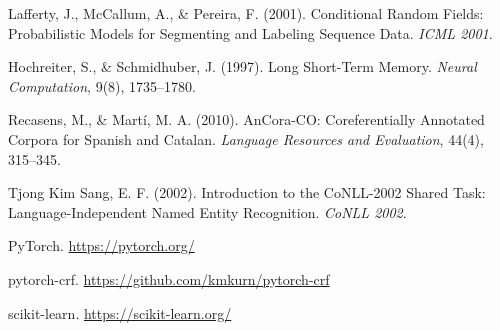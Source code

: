 \documentclass[12pt, a4paper]{article}
\begin{document}
\begin{enumerate}[leftmargin=*, label={[\arabic*]}]
    \item Lafferty, J., McCallum, A., \& Pereira, F. (2001). Conditional Random Fields:
          Probabilistic Models for Segmenting and Labeling Sequence Data.
          \textit{ICML 2001}.
    \item Hochreiter, S., \& Schmidhuber, J. (1997). Long Short-Term Memory.
          \textit{Neural Computation}, 9(8), 1735--1780.
    \item Recasens, M., \& Martí, M. A. (2010). AnCora-CO: Coreferentially
          Annotated Corpora for Spanish and Catalan. \textit{Language Resources
          and Evaluation}, 44(4), 315--345.
    \item Tjong Kim Sang, E. F. (2002). Introduction to the CoNLL-2002 Shared Task:
          Language-Independent Named Entity Recognition. \textit{CoNLL 2002}.
    \item PyTorch. \url{https://pytorch.org/}
    \item pytorch-crf. \url{https://github.com/kmkurn/pytorch-crf}
    \item scikit-learn. \url{https://scikit-learn.org/}
\end{enumerate}
\end{document}
